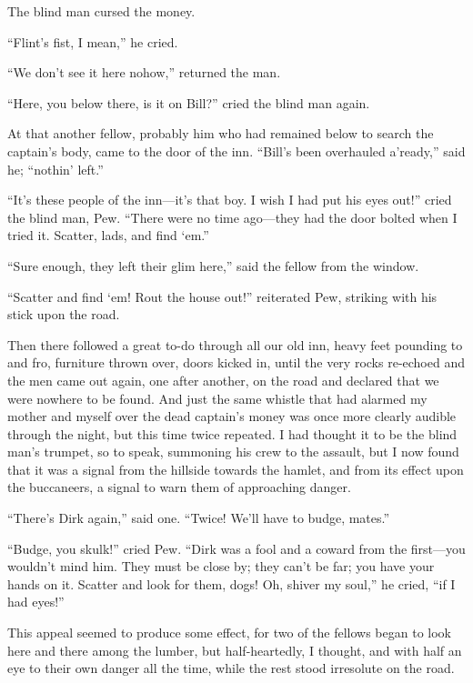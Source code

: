 The blind man cursed the money.

\enquote{Flint’s fist, I mean,} he cried.

\enquote{We don’t see it here nohow,} returned the man.

\enquote{Here, you below there, is it on Bill?} cried the blind man again.

At that another fellow, probably him who had remained below to search the captain’s body, came to the door of the inn. \enquote{Bill’s been overhauled a’ready,} said he; \enquote{nothin’ left.}

\enquote{It’s these people of the inn---it’s that boy. I wish I had put his eyes out!} cried the blind man, Pew. \enquote{There were no time ago---they had the door bolted when I tried it. Scatter, lads, and find `em.}

\enquote{Sure enough, they left their glim here,} said the fellow from the window.

\enquote{Scatter and find `em! Rout the house out!} reiterated Pew, striking with his stick upon the road.

Then there followed a great to-do through all our old inn, heavy feet pounding to and fro, furniture thrown over, doors kicked in, until the very rocks re-echoed and the men came out again, one after another, on the road and declared that we were nowhere to be found. And just the same whistle that had alarmed my mother and myself over the dead captain’s money was once more clearly audible through the night, but this time twice repeated. I had thought it to be the blind man’s trumpet, so to speak, summoning his crew to the assault, but I now found that it was a signal from the hillside towards the hamlet, and from its effect upon the buccaneers, a signal to warn them of approaching danger.

\enquote{There’s Dirk again,} said one. \enquote{Twice! We’ll have to budge, mates.}

\enquote{Budge, you skulk!} cried Pew. \enquote{Dirk was a fool and a coward from the first---you wouldn’t mind him. They must be close by; they can’t be far; you have your hands on it. Scatter and look for them, dogs! Oh, shiver my soul,} he cried, \enquote{if I had eyes!}

This appeal seemed to produce some effect, for two of the fellows began to look here and there among the lumber, but half-heartedly, I thought, and with half an eye to their own danger all the time, while the rest stood irresolute on the road.

